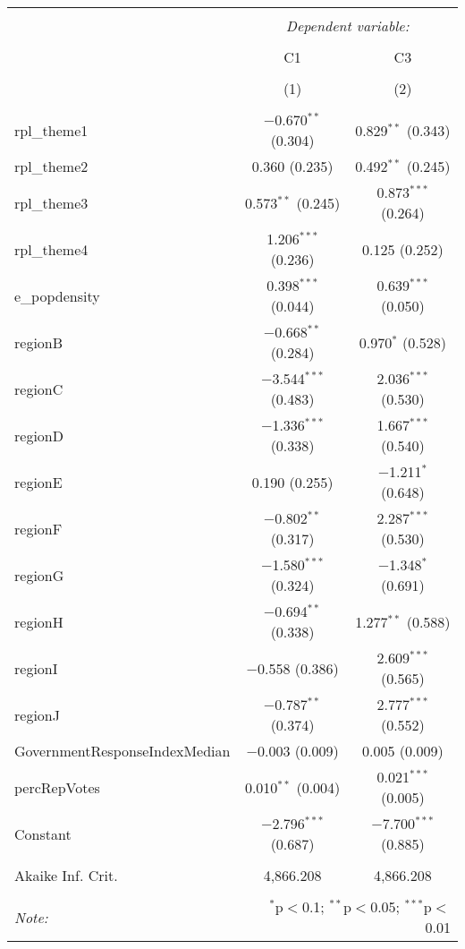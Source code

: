 
\begin{table}[!htbp] \centering 
  \caption{} 
  \label{} 
\begin{tabular}{@{\extracolsep{5pt}}lcc} 
\\[-1.8ex]\hline 
\hline \\[-1.8ex] 
 & \multicolumn{2}{c}{\textit{Dependent variable:}} \\ 
\cline{2-3} 
\\[-1.8ex] & C1 & C3 \\ 
\\[-1.8ex] & (1) & (2)\\ 
\hline \\[-1.8ex] 
 rpl\_theme1 & $-$0.670$^{**}$ (0.304) & 0.829$^{**}$ (0.343) \\ 
  rpl\_theme2 & 0.360 (0.235) & 0.492$^{**}$ (0.245) \\ 
  rpl\_theme3 & 0.573$^{**}$ (0.245) & 0.873$^{***}$ (0.264) \\ 
  rpl\_theme4 & 1.206$^{***}$ (0.236) & 0.125 (0.252) \\ 
  e\_popdensity & 0.398$^{***}$ (0.044) & 0.639$^{***}$ (0.050) \\ 
  regionB & $-$0.668$^{**}$ (0.284) & 0.970$^{*}$ (0.528) \\ 
  regionC & $-$3.544$^{***}$ (0.483) & 2.036$^{***}$ (0.530) \\ 
  regionD & $-$1.336$^{***}$ (0.338) & 1.667$^{***}$ (0.540) \\ 
  regionE & 0.190 (0.255) & $-$1.211$^{*}$ (0.648) \\ 
  regionF & $-$0.802$^{**}$ (0.317) & 2.287$^{***}$ (0.530) \\ 
  regionG & $-$1.580$^{***}$ (0.324) & $-$1.348$^{*}$ (0.691) \\ 
  regionH & $-$0.694$^{**}$ (0.338) & 1.277$^{**}$ (0.588) \\ 
  regionI & $-$0.558 (0.386) & 2.609$^{***}$ (0.565) \\ 
  regionJ & $-$0.787$^{**}$ (0.374) & 2.777$^{***}$ (0.552) \\ 
  GovernmentResponseIndexMedian & $-$0.003 (0.009) & 0.005 (0.009) \\ 
  percRepVotes & 0.010$^{**}$ (0.004) & 0.021$^{***}$ (0.005) \\ 
  Constant & $-$2.796$^{***}$ (0.687) & $-$7.700$^{***}$ (0.885) \\ 
 \hline \\[-1.8ex] 
Akaike Inf. Crit. & 4,866.208 & 4,866.208 \\ 
\hline 
\hline \\[-1.8ex] 
\textit{Note:}  & \multicolumn{2}{r}{$^{*}$p$<$0.1; $^{**}$p$<$0.05; $^{***}$p$<$0.01} \\ 
\end{tabular} 
\end{table} 
